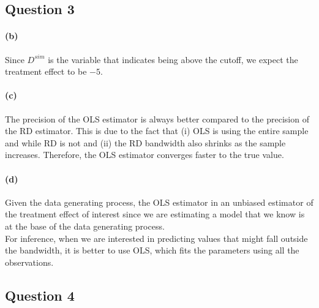 \documentclass{scrartcl}
\begin{document}
\subsection*{Question 3} %


\paragraph*{(b)}
Since $D^{sim}$ is the variable that indicates being above the cutoff, we expect the treatment effect to be $-5$.
 
\paragraph*{(c)}
The precision of the OLS estimator is always better compared to the precision of the RD estimator. This is due to the fact that (i) OLS is using the entire sample and while RD is not and (ii) the RD bandwidth also shrinks as the sample increases. Therefore, the OLS estimator converges faster to the true value. 






\paragraph*{(d)}
Given the data generating process, the OLS estimator in an unbiased estimator of the treatment effect of interest since we are estimating a model that we know is at the base of the data generating process. \\

For inference, when we are interested in predicting values that might fall outside the bandwidth, it is better to use OLS, which fits the parameters using all the observations.


\subsection*{Question 4} %
\end{document}
